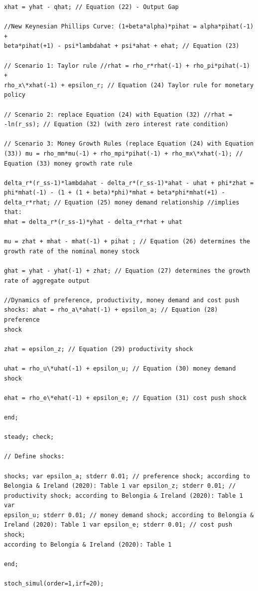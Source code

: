 \documentclass[11pt,preprint, authoryear]{elsarticle}
\numberwithin{equation}{section}
\numberwithin{figure}{section}
\numberwithin{table}{section}
\begin{document}
\begin{verbatim}
xhat = yhat - qhat; // Equation (22) - Output Gap

//New Keynesian Phillips Curve: (1+beta*alpha)*pihat = alpha*pihat(-1) +
beta*pihat(+1) - psi*lambdahat + psi*ahat + ehat; // Equation (23)

// Scenario 1: Taylor rule //rhat = rho_r*rhat(-1) + rho_pi*pihat(-1) +
rho_x\*xhat(-1) + epsilon_r; // Equation (24) Taylor rule for monetary
policy

// Scenario 2: replace Equation (24) with Equation (32) //rhat =
-ln(r_ss); // Equation (32) (with zero interest rate condition)

// Scenario 3: Money Growth Rules (replace Equation (24) with Equation
(33)) mu = rho_mm*mu(-1) + rho_mpi*pihat(-1) + rho_mx\*xhat(-1); //
Equation (33) money growth rate rule

delta_r*(r_ss-1)*lambdahat - delta_r*(r_ss-1)*ahat - uhat + phi*zhat =
phi*mhat(-1) - (1 + (1 + beta)*phi)*mhat + beta*phi*mhat(+1) -
delta_r*rhat; // Equation (25) money demand relationship //implies that:
mhat = delta_r*(r_ss-1)*yhat - delta_r*rhat + uhat

mu = zhat + mhat - mhat(-1) + pihat ; // Equation (26) determines the
growth rate of the nominal money stock

ghat = yhat - yhat(-1) + zhat; // Equation (27) determines the growth
rate of aggregate output

//Dynamics of preference, productivity, money demand and cost push
shocks: ahat = rho_a\*ahat(-1) + epsilon_a; // Equation (28) preference
shock

zhat = epsilon_z; // Equation (29) productivity shock

uhat = rho_u\*uhat(-1) + epsilon_u; // Equation (30) money demand shock

ehat = rho_e\*ehat(-1) + epsilon_e; // Equation (31) cost push shock

end;

steady; check;

// Define shocks:

shocks; var epsilon_a; stderr 0.01; // preference shock; according to
Belongia & Ireland (2020): Table 1 var epsilon_z; stderr 0.01; //
productivity shock; according to Belongia & Ireland (2020): Table 1 var
epsilon_u; stderr 0.01; // money demand shock; according to Belongia &
Ireland (2020): Table 1 var epsilon_e; stderr 0.01; // cost push shock;
according to Belongia & Ireland (2020): Table 1

end;

stoch_simul(order=1,irf=20);
\end{verbatim}


\end{document}

